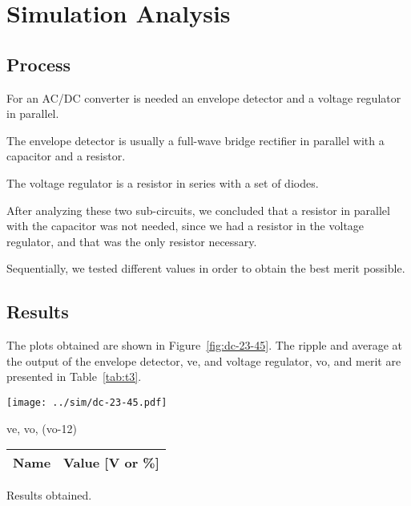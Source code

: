 \section{Simulation Analysis}
\label{sec:simulation}

\subsection{Process}

For an AC/DC converter is needed an envelope detector and a voltage regulator in parallel.

The envelope detector is usually a full-wave bridge rectifier in parallel
with a capacitor and a resistor.

The voltage regulator is a resistor in series with a set of diodes.

After analyzing these two sub-circuits, we concluded that a resistor in parallel
with the capacitor was not needed, since we had a resistor in the voltage
regulator, and that was the only resistor necessary.

Sequentially, we tested different values in order to obtain the best merit possible.


\subsection{Results}

The plots obtained are shown in Figure~\ref{fig:dc-23-45}. The ripple and average at the output
of the envelope detector, ve, and voltage regulator, vo, and merit are presented in Table~\ref{tab:t3}.\\


\begin{minipage}[b]{0.46\textwidth}
\centering
    \centering
    \texttt{[image: ../sim/dc-23-45.pdf]}
    \captionsetup{type=figure}
    \caption{ve, vo, (vo-12)}
    \label{fig:dc-23-45}
\end{minipage}
\hfill
\begin{minipage}[b]{0.46\textwidth}
\centering
   \begin{tabular}{|l|r|}
    \hline    
    {\bf Name} & {\bf Value [V or \%]} \\ \hline
    
   \end{tabular}
    \captionsetup{type=table}   
  \caption{Results obtained.}
  \label{tab:t3}
\end{minipage}
